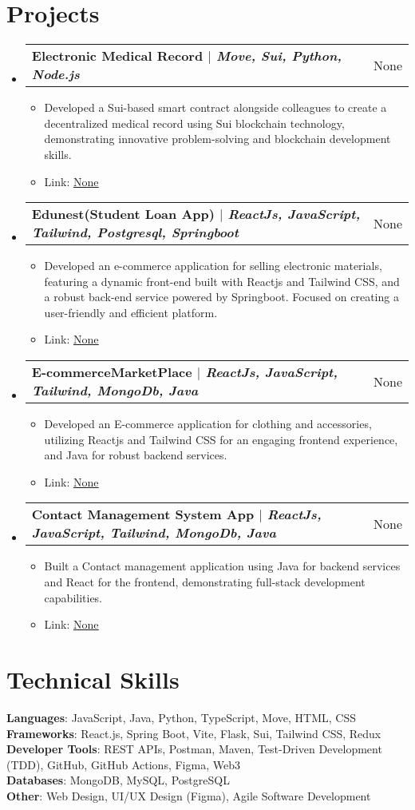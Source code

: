 \documentclass[letterpaper,11pt]{article}
\makeatletter
\newcommand{\resumeItem}[1]{
  \item\small{
    {#1 \vspace{-2pt}}
  }
}
\newcommand{\resumeProjectHeading}[2]{
    \item
    \begin{tabular*}{0.97\textwidth}{l@{\extracolsep{\fill}}r}
      \small#1 & #2 \\
    \end{tabular*}\vspace{-7pt}
}
\newcommand{\resumeSubHeadingListStart}{\begin{itemize}[leftmargin=0.15in, label={}]}
\newcommand{\resumeSubHeadingListEnd}{\end{itemize}}
\newcommand{\resumeItemListStart}{\begin{itemize}}
\newcommand{\resumeItemListEnd}{\end{itemize}\vspace{-5pt}}
\makeatother
\begin{document}
\section{Projects}
    \resumeSubHeadingListStart
      \resumeProjectHeading
          {\textbf{Electronic Medical Record $|$ \emph{Move, Sui, Python, Node.js}}}{None}
          \resumeItemListStart
            \resumeItem{Developed a Sui-based smart contract alongside colleagues to create a decentralized medical record using Sui blockchain technology, demonstrating innovative problem-solving and blockchain development skills.}
            \resumeItem{Link: \href{None}{\underline{None}}}
          \resumeItemListEnd
      \resumeProjectHeading
          {\textbf{Edunest(Student Loan App) $|$ \emph{ReactJs, JavaScript, Tailwind, Postgresql, Springboot}}}{None}
          \resumeItemListStart
            \resumeItem{Developed an e-commerce application for selling electronic materials, featuring a dynamic front-end built with Reactjs and Tailwind CSS, and a robust back-end service powered by Springboot. Focused on creating a user-friendly and efficient platform.}
            \resumeItem{Link: \href{None}{\underline{None}}}
          \resumeItemListEnd
      \resumeProjectHeading
          {\textbf{E-commerceMarketPlace $|$ \emph{ReactJs, JavaScript, Tailwind, MongoDb, Java}}}{None}
          \resumeItemListStart
            \resumeItem{Developed an E-commerce application for clothing and accessories, utilizing Reactjs and Tailwind CSS for an engaging frontend experience, and Java for robust backend services.}
            \resumeItem{Link: \href{None}{\underline{None}}}
          \resumeItemListEnd
      \resumeProjectHeading
          {\textbf{Contact Management System App $|$ \emph{ReactJs, JavaScript, Tailwind, MongoDb, Java}}}{None}
          \resumeItemListStart
            \resumeItem{Built a Contact management application using Java for backend services and React for the frontend, demonstrating full-stack development capabilities.}
            \resumeItem{Link: \href{None}{\underline{None}}}
          \resumeItemListEnd
    \resumeSubHeadingListEnd

\section{Technical Skills}
 \begin{itemize}[leftmargin=0.15in, label={}]
    \small{\item{
     \textbf{Languages}: JavaScript, Java, Python, TypeScript, Move, HTML, CSS \\
     \textbf{Frameworks}: React.js, Spring Boot, Vite, Flask, Sui, Tailwind CSS, Redux \\
     \textbf{Developer Tools}: REST APIs, Postman, Maven, Test-Driven Development (TDD), GitHub, GitHub Actions, Figma, Web3 \\
     \textbf{Databases}: MongoDB, MySQL, PostgreSQL \\
     \textbf{Other}: Web Design, UI/UX Design (Figma), Agile Software Development
    }}
 \end{itemize}

\end{document}
